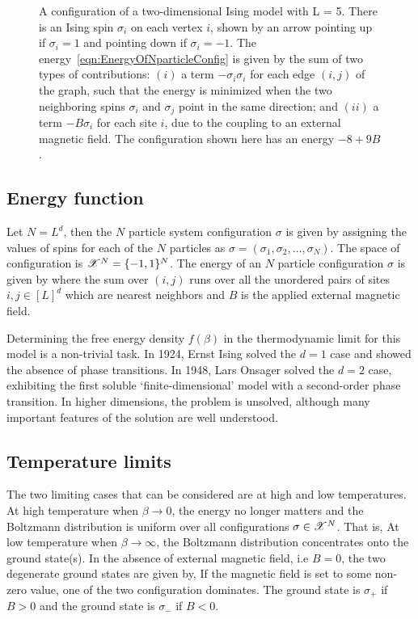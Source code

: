 \documentclass[letterpaper,english,10pt]{article}
\begin{document}
\begin{figure}
\centering

\caption{A configuration of a two-dimensional Ising model with L = 5. There is an Ising spin $\sigma_i$ on each vertex $i$, shown by an arrow pointing up if $\sigma_i = 1$ and pointing down if $\sigma_i = -1$.
The energy~\eqref{eqn:EnergyOfNparticleConfig}  is given by the sum of two types of contributions: 
$(i)$ a term $-\sigma_i\sigma_i$ for each edge $(i, j)$ of the graph, such that the energy is minimized when the two neighboring spins $\sigma_i$ and $\sigma_j$ point in the same direction; 
and $(ii)$ a term $-B\sigma_i$ for each site $i$, due to the coupling to an external magnetic field. 
The configuration shown here has an energy $-8+9B$.}
\label{figure:IsingSpins}
\end{figure}

\subsection{Energy function}
Let $N = L^d$, then the $N$ particle system configuration $\sigma$ is given by assigning the values of spins  for each of the $N$ particles as $\sigma = (\sigma_1, \sigma_2, \dots, \sigma_N)$. 
The space of configuration is $\mathscr{X}^N = \{-1,1\}^N$. 
The energy of an $N$ particle configuration $\sigma$ is given by
where the sum over $(i,j)$ runs over all the unordered pairs of sites $i,j \in [L]^d$ which are nearest neighbors and $B$ is the applied external magnetic field. 


Determining the free energy density $f(\beta)$ in the thermodynamic limit for this model is a non-trivial task. In 1924, Ernst Ising solved the $d=1$ case and showed the absence of phase transitions. 
In 1948, Lars Onsager solved the $d=2$ case, exhibiting the first soluble `finite-dimensional' model with a second-order phase transition. 
In higher dimensions, the problem is unsolved, although many important features of the solution are well understood.

\subsection{Temperature limits}
The two limiting cases that can be considered are at high and low temperatures. 
At high temperature when $\beta \to 0$, the energy no longer matters and the Boltzmann distribution is uniform over all configurations $\sigma \in \mathscr{X}^N$. 
That is, 
At low temperature when $\beta \to \infty$, 
the Boltzmann distribution concentrates onto the ground state(s). 
In the absence of external magnetic field, i.e $B=0$, the two degenerate ground states are given by,
If the magnetic field is set to some non-zero value, one of the two configuration dominates. 
The ground state is $\sigma_+$ if $B>0$ and the ground state is $\sigma_-$ if $B<0$.
\end{document}

